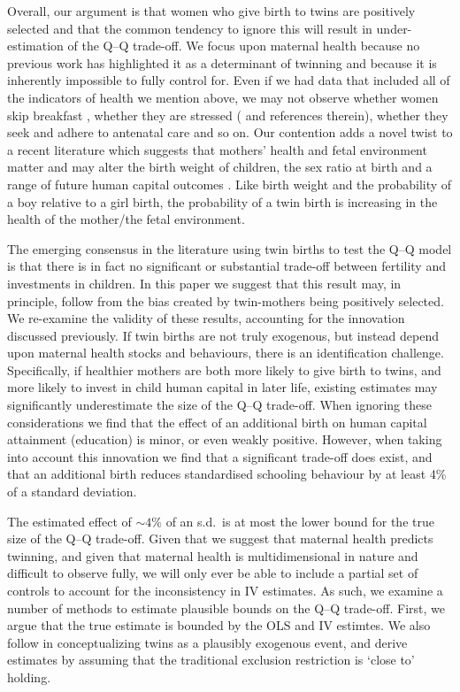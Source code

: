 \documentclass[subeqn]{article}
\begin{document}
\begin{spacing}{1.4}
Overall, our argument is that women who give birth to twins are positively 
selected and that the common tendency to ignore this will result in under-%
estimation of the Q--Q trade-off. We focus upon maternal health because no 
previous work has highlighted it as a determinant of twinning and because it is 
inherently impossible to fully control for. Even if we had data that included 
all of the indicators of health we mention above, we may not observe whether 
women skip breakfast \citep{MazumderSeeskin2014}, whether they are stressed 
(\citet{Blacketal2014} and references therein), whether they seek and adhere to 
antenatal care and so on. Our contention adds a novel twist to a recent 
literature which suggests that mothers' health and fetal environment matter and 
may alter the birth weight of children, the sex ratio at birth and a range of 
future human capital outcomes \citep{Almondetal2011,BhalotraRawlings2013,Barker1995}. 
Like birth weight and the probability of a boy relative to a girl birth, the 
probability of a twin birth is increasing in the health of the mother/the fetal 
environment.

The emerging consensus in the literature using twin births to test the Q--Q 
model is that there is in fact no significant or substantial trade-off between 
fertility and investments in children. In this paper we suggest that this result 
may, in principle, follow from the bias created by twin-mothers being positively 
selected. We re-examine the validity of these results, accounting for the 
innovation discussed previously.  If twin births are not truly exogenous, but 
instead depend upon maternal health stocks and behaviours, there is an 
identification challenge.  Specifically, if healthier mothers are both more 
likely to give birth to twins, and more likely to invest in child human capital 
in later life, existing estimates may significantly underestimate the size of the 
Q--Q trade-off.  When ignoring these considerations we find that the effect of an 
additional birth on human capital attainment (education) is minor, or even weakly 
positive. However, when taking into account this innovation we find that a 
significant trade-off does exist, and that an additional birth reduces 
standardised schooling behaviour by at least 4\% of a standard deviation.

The estimated effect of $\sim 4\%$ of an s.d.\ is at most the lower bound for 
the true size of the Q--Q trade-off. Given that we suggest that maternal health 
predicts twinning, and given that maternal health is multidimensional in nature 
and difficult to observe fully, we will only ever be able to include a partial 
set of controls to account for the inconsistency in IV estimates. As such, we 
examine a number of methods to estimate plausible bounds on the Q--Q trade-off. 
First, we argue that the true estimate is bounded by the OLS and IV estimtes. 
We also follow \citet{Conleyetal2012} in conceptualizing twins as a plausibly 
exogenous event, and derive estimates by assuming that the traditional exclusion 
restriction is `close to' holding.


\end{spacing}
\end{document}
